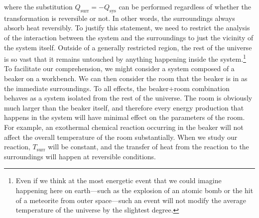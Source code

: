 \documentclass[
  9pt,
]{extbook}
\theoremstyle{definition}
\theoremstyle{definition}
\theoremstyle{definition}
\theoremstyle{remark}
\begin{document}
where the substitution \(Q_{\text{surr}}=-Q_{\text{sys}}\) can be performed regardless of whether the transformation is reversible or not. In other words, the surroundings always absorb heat reversibly. To justify this statement, we need to restrict the analysis of the interaction between the system and the surroundings to just the vicinity of the system itself. Outside of a generally restricted region, the rest of the universe is so vast that it remains untouched by anything happening inside the system.\footnote{Even if we think at the most energetic event that we could imagine happening here on earth---such as the explosion of an atomic bomb or the hit of a meteorite from outer space---such an event will not modify the average temperature of the universe by the slightest degree.} To facilitate our comprehension, we might consider a system composed of a beaker on a workbench. We can then consider the room that the beaker is in as the immediate surroundings. To all effects, the beaker+room combination behaves as a system isolated from the rest of the universe. The room is obviously much larger than the beaker itself, and therefore every energy production that happens in the system will have minimal effect on the parameters of the room. For example, an exothermal chemical reaction occurring in the beaker will not affect the overall temperature of the room substantially. When we study our reaction, \(T_{\text{surr}}\) will be constant, and the transfer of heat from the reaction to the surroundings will happen at reversible conditions.
\end{document}
